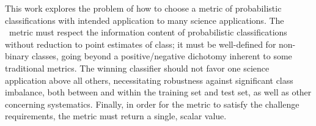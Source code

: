 This work explores the problem of how to choose a metric of probabilistic classifications with intended application to many science applications.
The \plasticc\ metric must respect the information content of probabilistic classifications without reduction to point estimates of class;
it must be well-defined for non-binary classes, going beyond a positive/negative dichotomy inherent to some traditional metrics.
The winning classifier should not favor one science application above all others, necessitating robustness against significant class imbalance, both between and within the training set and test set, as well as other concerning systematics.
Finally, in order for the metric to satisfy the challenge requirements, the metric must return a single, scalar value.

